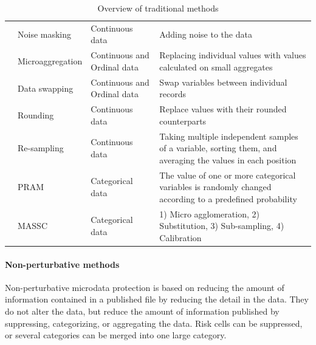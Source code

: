 \documentclass{article}
\begin{document}
\begin{table}[H]
\begin{tabular}{|p{4cm}|p{4cm}|p{4cm}|p{6cm}|}
\multicolumn{1}{|l|}{} & Noise masking         & Continuous data                 & Adding noise to the data                                                                                                     \\ \cline{2-4} 
\multicolumn{1}{|l|}{} & Microaggregation      & Continuous and Ordinal data     & Replacing individual values with values calculated on small aggregates                                                       \\ \cline{2-4} 
\multicolumn{1}{|l|}{} & Data swapping         & Continuous and Ordinal data     & Swap variables between individual records                                                                                    \\ \cline{2-4} 
\multicolumn{1}{|l|}{} & Rounding              & Continuous data                 & Replace values with their rounded counterparts                                                                                       \\ \cline{2-4} 
\multicolumn{1}{|l|}{} & Re-sampling           & Continuous data                 & Taking multiple independent samples of a variable, sorting them, and averaging the values in each position \\ \cline{2-4} 
\multicolumn{1}{|l|}{} & PRAM                  & Categorical data                & The value of one or more categorical variables is randomly changed according to a predefined probability                     \\ \cline{2-4} 
\multicolumn{1}{|l|}{} & MASSC                 & Categorical data                & 1) Micro agglomeration, 2) Substitution, 3) Sub-sampling, 4) Calibration                                                        \\ \hline
\end{tabular}
    \caption{Overview of traditional methods}
    \label{tab:Overview_trad}
\end{table}

\paragraph{Non-perturbative methods} 
Non-perturbative microdata protection is based on reducing the amount of information contained in a published file by reducing the detail in the data. They do not alter the data, but reduce the amount of information published by suppressing, categorizing, or aggregating the data. Risk cells can be suppressed, or several categories can be merged into one large category. 
\end{document}
